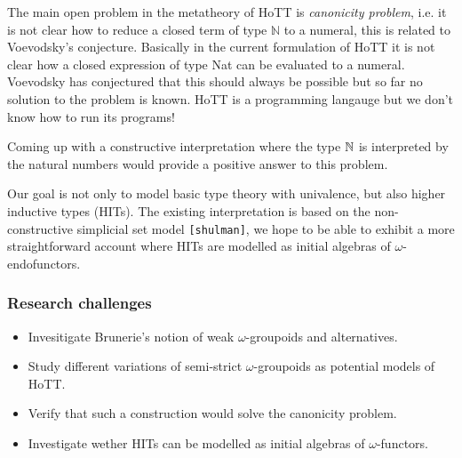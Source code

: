 \documentclass[twocolumn,a4paper,11pt]{article}
\renewcommand{\cite}[1]{{\tt[#1]}}
\begin{document}
The main open problem in the metatheory of HoTT is \emph{canonicity
  problem}, i.e. it is not clear how to reduce a closed term of type
$\mathbb{N}$ to a numeral, this is related to Voevodsky's conjecture.  Basically in the current
formulation of HoTT it is not clear how a closed expression of type
Nat can be evaluated to a numeral. Voevodsky has conjectured that this
should always be possible but so far no solution to the problem is
known. HoTT is a programming langauge but we don't know how
to run its programs!

Coming up with a constructive interpretation where the type $\Bbb{N}$ 
is interpreted by the natural numbers would provide a positive answer
to this problem.

Our goal is not only to model basic type theory with univalence, but
also higher inductive types (HITs). The existing interpretation is
based on the non-constructive simplicial set model \cite{shulman}, we
hope to be able to exhibit a more straightforward account where HITs
are modelled as initial algebras of $\omega$-endofunctors.

\subsubsection*{Research challenges}
\label{sec:rsearch-challenges}
\begin{itemize}
\item Invesitigate Brunerie's notion of weak $\omega$-groupoids and alternatives.
\item Study different variations of semi-strict $\omega$-groupoids as
  potential models of HoTT.
\item Verify that such a construction would solve the canonicity problem.
\item Investigate wether HITs can be modelled as initial algebras of
  $\omega$-functors. 
\end{itemize}


\end{document}
